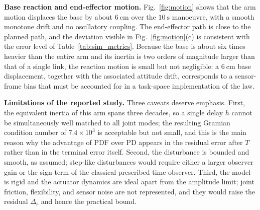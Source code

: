 \textbf{Base reaction and end-effector motion.} Fig.~\ref{fig:motion} shows that the arm motion displaces the base by about $6~\mathrm{cm}$ over the $10~\mathrm{s}$ manoeuvre, with a smooth monotone drift and no oscillatory coupling. The end-effector path is close to the planned path, and the deviation visible in Fig.~\ref{fig:motion}(c) is consistent with the error level of Table~\ref{tab:sim_metrics}. Because the base is about six times heavier than the entire arm and its inertia is two orders of magnitude larger than that of a single link, the reaction motion is small but not negligible: a $6~\mathrm{cm}$ base displacement, together with the associated attitude drift, corresponds to a sensor-frame bias that must be accounted for in a task-space implementation of the law.

\textbf{Limitations of the reported study.} Three caveats deserve emphasis. First, the equivalent inertia of this arm spans three decades, so a single delay $h$ cannot be simultaneously well matched to all joint modes; the resulting Gramian condition number of $7.4\times10^{3}$ is acceptable but not small, and this is the main reason why the advantage of PDF over PD appears in the residual error after $T$ rather than in the terminal error itself. Second, the disturbance is bounded and smooth, as assumed; step-like disturbances would require either a larger observer gain or the sign term of the classical prescribed-time observer. Third, the model is rigid and the actuator dynamics are ideal apart from the amplitude limit; joint friction, flexibility, and sensor noise are not represented, and they would raise the residual $\Delta_r$ and hence the practical bound.
